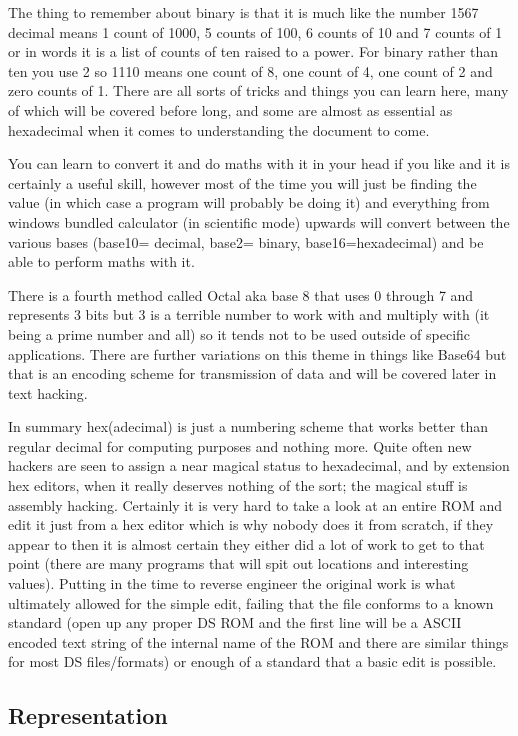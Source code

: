 \documentclass[
]{book}
\begin{document}
The thing to remember about binary is that it is much like the number 1567 decimal means 1 count of 1000, 5 counts of 100, 6 counts of 10 and 7 counts of 1 or in words it is a list of counts of ten raised to a power. For binary rather than ten you use 2 so 1110 means one count of 8, one count of 4, one count of 2 and zero counts of 1. There are all sorts of tricks and things you can learn here, many of which will be covered before long, and some are almost as essential as hexadecimal when it comes to understanding the document to come.

You can learn to convert it and do maths with it in your head if you like and it is certainly a useful skill, however most of the time you will just be finding the value (in which case a program will probably be doing it) and everything from windows bundled calculator (in scientific mode) upwards will convert between the various bases (base10= decimal, base2= binary, base16=hexadecimal) and be able to perform maths with it.

There is a fourth method called Octal aka base 8 that uses 0 through 7 and represents 3 bits but 3 is a terrible number to work with and multiply with (it being a prime number and all) so it tends not to be used outside of specific applications. There are further variations on this theme in things like Base64 but that is an encoding scheme for transmission of data and will be covered later in text hacking.

In summary hex(adecimal) is just a numbering scheme that works better than regular decimal for computing purposes and nothing more. Quite often new hackers are seen to assign a near magical status to hexadecimal, and by extension hex editors, when it really deserves nothing of the sort; the magical stuff is assembly hacking. Certainly it is very hard to take a look at an entire ROM and edit it just from a hex editor which is why nobody does it from scratch, if they appear to then it is almost certain they either did a lot of work to get to that point (there are many programs that will spit out locations and interesting values). Putting in the time to reverse engineer the original work is what ultimately allowed for the simple edit, failing that the file conforms to a known standard (open up any proper DS ROM and the first line will be a ASCII encoded text string of the internal name of the ROM and there are similar things for most DS files/formats) or enough of a standard that a basic edit is possible.

\hypertarget{representation}{%
\subsection{Representation}\label{representation}}
\end{document}
